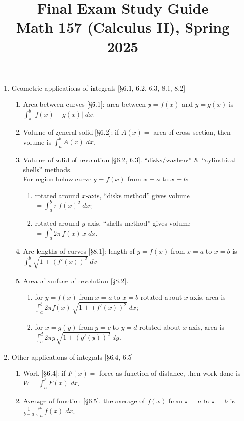 \documentclass[11pt]{article}
\title{Final Exam Study Guide \\ Math 157 (Calculus II), Spring 2025}
\date{}
\begin{document}
\maketitle

\thispagestyle{empty}

\vspace{-2.4cm}

\begin{enumerate}
\item Geometric applications of integrals [\S6.1, 6.2, 6.3, 8.1, 8.2]
\begin{enumerate}
\item Area between curves [\S6.1]: area between $y=f(x)$ and $y=g(x)$ is $\int_{a}^{b} |f(x)-g(x)| \; dx$.
\item Volume of general solid [\S6.2]: if $A(x)=$ area of cross-section, then volume is $\int_a^b A(x) \;dx$.
\item Volume of solid of revolution [\S6.2, 6.3]: ``disks/washers'' $\&$ ``cylindrical shells'' methods.  \\For region below curve $y=f(x)$ from $x=a$ to $x=b$:
\begin{enumerate}
\item rotated around $x$-axis, ``disks method'' gives volume $=\int_a^b \pi \, f(x)^2 \; dx$;
\item rotated around $y$-axis, ``shells method'' gives volume $=\int_a^b 2 \pi \, f(x) \, x \; dx$.
\end{enumerate}
\item Arc lengths of curves [\S8.1]: length of $y=f(x)$ from $x=a$ to $x=b$ is $\int_{a}^{b} \sqrt{1+(f'(x))^2} \; dx$.
\item Area of surface of revolution [\S8.2]: 
\begin{enumerate}
\item for $y=f(x)$ from $x=a$ to $x=b$ rotated about $x$-axis, area is $\int_{a}^{b} 2\pi f(x) \, \sqrt{1+(f'(x))^2} \; dx$;
\item for $x=g(y)$ from $y=c$ to $y=d$ rotated about $x$-axis, area is $\int_{c}^{d} 2\pi y \, \sqrt{1+(g'(y))^2} \; dy$.
\end{enumerate}
\end{enumerate}

\item Other applications of integrals [\S6.4, 6.5]
\begin{enumerate}
\item Work [\S6.4]: if $F(x)=$ force as function of distance, then work done is $W=\int_{a}^{b} F(x) \; dx$.
\item Average of function [\S6.5]: the average of $f(x)$ from $x=a$ to $x=b$ is $\frac{1}{b-a}\int_a^b f(x) \; dx$.
\end{enumerate}


\end{enumerate}
\end{document}

